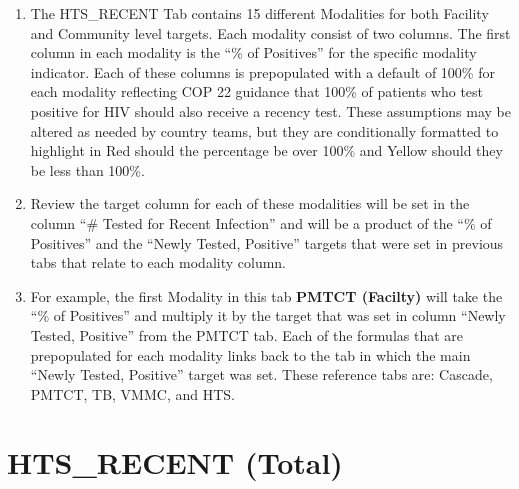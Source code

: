 \documentclass[
  openany]{book}
\begin{document}
\begin{enumerate}
\def\labelenumi{\arabic{enumi}.}
\item
  The HTS\_RECENT Tab contains 15 different Modalities for both
  Facility and Community level targets. Each modality consist of two
  columns. The first column in each modality is the ``\% of Positives''
  for the specific modality indicator. Each of these columns is
  prepopulated with a default of 100\% for each modality reflecting COP
  22 guidance that 100\% of patients who test positive for HIV should
  also receive a recency test. These assumptions may be altered as
  needed by country teams, but they are conditionally formatted to
  highlight in Red should the percentage be over 100\% and Yellow
  should they be less than 100\%.
\item
  Review the target column for each of these modalities will be set in
  the column ``\# Tested for Recent Infection'' and will be a product of
  the ``\% of Positives'' and the ``Newly Tested, Positive'' targets that
  were set in previous tabs that relate to each modality column.
\item
  For example, the first Modality in this tab \textbf{PMTCT (Facilty)} will
  take the ``\% of Positives'' and multiply it by the target that was set
  in column ``Newly Tested, Positive'' from the PMTCT tab. Each of the
  formulas that are prepopulated for each modality links back to the
  tab in which the main ``Newly Tested, Positive'' target was set. These
  reference tabs are: Cascade, PMTCT, TB, VMMC, and HTS.
\end{enumerate}

\hypertarget{hts_recent-total}{%
\section{HTS\_RECENT (Total)}\label{hts_recent-total}}
\end{document}
